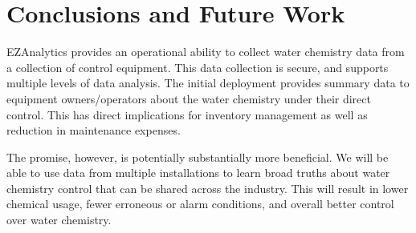 \section{Conclusions and Future Work}
\label{sec:conclude}

EZAnalytics provides an operational ability to collect water chemistry
data from a collection of control equipment.  This data collection
is secure, and supports multiple levels of data analysis.
The initial deployment provides summary data to equipment owners/operators
about the water chemistry under their direct control.
This has direct implications for inventory management as well as
reduction in maintenance expenses.

The promise, however, is potentially substantially more beneficial.  We will
be able to use data from multiple installations to learn broad truths
about water chemistry control that can be shared across the industry.
This will result in lower chemical usage, fewer erroneous or alarm
conditions, and overall better control over water chemistry.
